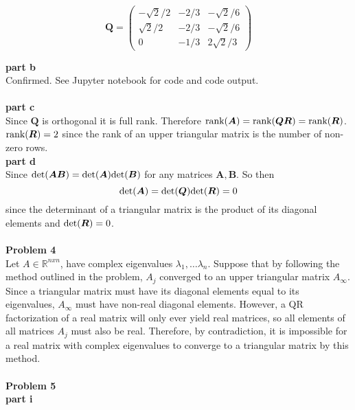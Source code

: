\documentclass{article} %
\begin{document}
\begin{equation}
\boldsymbol{Q} = \begin{pmatrix} -\sqrt{2}/2 & -2/3 & -\sqrt{2}/6 \\ \sqrt{2}/2 & -2/3 & -\sqrt{2}/6 \\ 0 & -1/3 & 2\sqrt{2}/3 \end{pmatrix} 
\end{equation}

\textbf{part b} \\
Confirmed. See Jupyter notebook for code and code output. \\
\\
\textbf{part c}\\
Since $\boldsymbol{Q}$ is orthogonal it is full rank.  Therefore $\hbox{rank}(\boldsymbol{A}) = \hbox{rank}(\boldsymbol{QR}) = \hbox{rank}(\boldsymbol{R})$.  $ \hbox{rank}(\boldsymbol{R}) = 2$ since the rank of an upper triangular matrix is the number of non-zero rows. \\

\textbf{part d} \\
Since $\hbox{det}(\boldsymbol{AB}) = \hbox{det}(\boldsymbol{A})\hbox{det}(\boldsymbol{B})$ for any matrices $\boldsymbol{A},\boldsymbol{B}$.  So then
\begin{equation}
\hbox{det}(\boldsymbol{A}) = \hbox{det}(\boldsymbol{Q}) \hbox{det}(\boldsymbol{R}) = 0
\end{equation}
since the determinant of a triangular matrix is the product of its diagonal elements and $\hbox{det}(\boldsymbol{R}) = 0$.
\\
\\

\textbf{Problem 4} \\
Let $A \in \mathbb{R}^{nxn}$, have complex eigenvalues $\lambda_1, \dots \lambda_n$.  Suppose that by following the method outlined in the problem, $A_j$ converged to an upper triangular matrix $A_{\infty}$.  Since a triangular matrix must have its diagonal elements equal to its eigenvalues, $A_{\infty}$ must have non-real diagonal elements.  However, a QR factorization of a real matrix will only ever yield real matrices, so all elements of all matrices $A_j$ must also be real.  Therefore, by contradiction, it is impossible for a real matrix with complex eigenvalues to converge to a triangular matrix by this method.
\\
\\

\textbf{Problem 5} \\
\textbf{part i} \\
\end{document}
